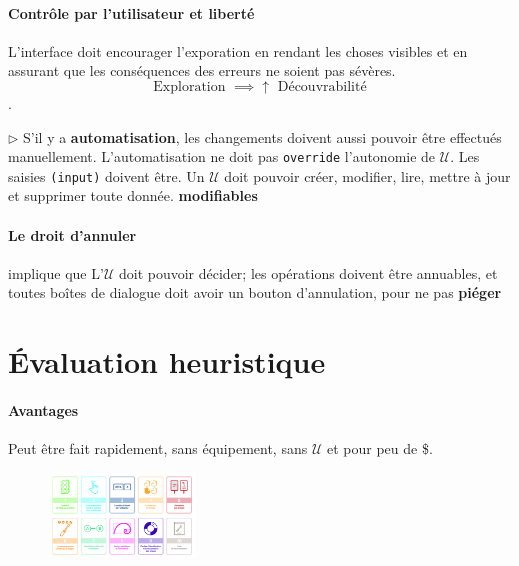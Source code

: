 \documentclass{report}
\begin{document}
\begin{multicols*}{3}
    \paragraph{Contrôle par l'utilisateur et liberté}
    L'interface doit encourager l'exporation en rendant les choses visibles 
    et en assurant que les conséquences des erreurs ne soient pas sévères. 
    \[ \text{Exploration } \implies \uparrow \text{ Découvrabilité}\]. 
    

    \noindent $\rhd {}$ S'il y a \textbf{automatisation}, les changements doivent 
    aussi pouvoir être effectués manuellement. L'automatisation ne doit 
    pas \texttt{override} l'autonomie de $\mathcal{U}$. Les saisies
    \texttt{(input)} doivent être. Un $\mathcal{U}$ doit pouvoir 
    créer, modifier, lire, mettre à jour et supprimer toute donnée. 
    \textbf{modifiables}  
    
    \paragraph{Le droit d'annuler} implique que 
    L'$\mathcal{U}$ doit pouvoir décider; les opérations doivent être annuables, 
    et toutes boîtes de dialogue doit avoir un bouton d'annulation, pour ne pas 
    \textbf{piéger}  

    \section{Évaluation heuristique}
    \paragraph{Avantages} Peut être fait rapidement, sans 
    équipement, sans $\mathcal{U}$ et pour peu de \$. 



    \begin{figure}[H]
      \begin{center}
        \includegraphics[width=0.35\textwidth]{DixHeur.jpg}
      \end{center}
    \end{figure}


\end{multicols*}
\end{document}
